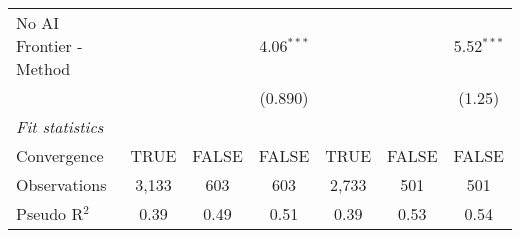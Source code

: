 \begin{tabular}{lcccccc}
   No AI Frontier - Method &               &              & 4.06$^{***}$ &              &              & 5.52$^{***}$\\   
                           &               &              & (0.890)      &              &              & (1.25)\\   
   \midrule
   \emph{Fit statistics}\\
   Convergence             &TRUE           & FALSE        & FALSE        & TRUE         & FALSE        & FALSE\\  
   Observations            & 3,133         & 603          & 603          & 2,733        & 501          & 501\\  
   Pseudo R$^2$            & 0.39          & 0.49         & 0.51         & 0.39         & 0.53         & 0.54\\  
   

\end{tabular}
